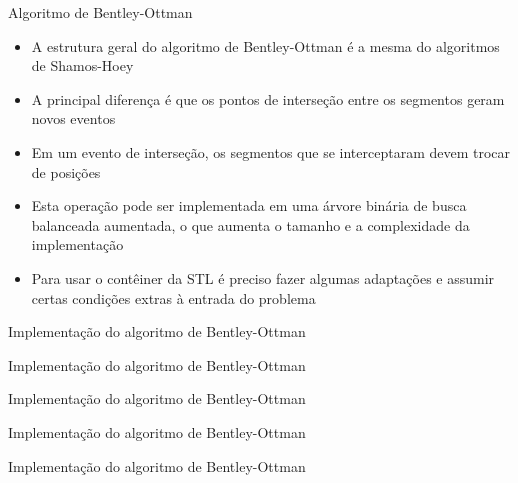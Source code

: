\begin{frame}[fragile]{Algoritmo de Bentley-Ottman}

    \begin{itemize}
        \item A estrutura geral do algoritmo de Bentley-Ottman é a mesma do algoritmos de
            Shamos-Hoey
        \pause

        \item A principal diferença é que os pontos de interseção entre os segmentos geram
            novos eventos
        \pause

        \item Em um evento de interseção, os segmentos que se interceptaram devem trocar de
            posições
        \pause

        \item Esta operação pode ser implementada em uma árvore binária de busca balanceada
            aumentada, o que aumenta o tamanho e a complexidade da implementação
        \pause

        \item Para usar o contêiner  da STL é preciso fazer algumas adaptações 
            e assumir certas condições extras à entrada do problema
    \end{itemize}

\end{frame}



\begin{frame}[fragile]{Implementação do algoritmo de Bentley-Ottman}
\end{frame}

\begin{frame}[fragile]{Implementação do algoritmo de Bentley-Ottman}
\end{frame}

\begin{frame}[fragile]{Implementação do algoritmo de Bentley-Ottman}
\end{frame}

\begin{frame}[fragile]{Implementação do algoritmo de Bentley-Ottman}
\end{frame}

\begin{frame}[fragile]{Implementação do algoritmo de Bentley-Ottman}
\end{frame}

